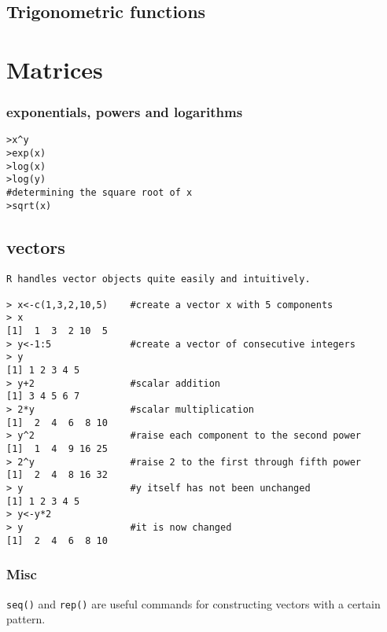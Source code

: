 \documentclass[a4paper,12pt]{article}
\begin{document}
\begin{itemize}
\subsection{Trigonometric functions}
\section{Matrices}



\subsubsection{exponentials, powers and logarithms}
\begin{framed}
\begin{verbatim}
>x^y
>exp(x)
>log(x)
>log(y)
#determining the square root of x
>sqrt(x)
\end{verbatim}
\end{framed}

\subsection{vectors}
\begin{framed}
\begin{verbatim}
R handles vector objects quite easily and intuitively.

> x<-c(1,3,2,10,5)    #create a vector x with 5 components
> x
[1]  1  3  2 10  5
> y<-1:5              #create a vector of consecutive integers
> y
[1] 1 2 3 4 5
> y+2                 #scalar addition
[1] 3 4 5 6 7
> 2*y                 #scalar multiplication
[1]  2  4  6  8 10
> y^2                 #raise each component to the second power
[1]  1  4  9 16 25
> 2^y                 #raise 2 to the first through fifth power
[1]  2  4  8 16 32
> y                   #y itself has not been unchanged
[1] 1 2 3 4 5
> y<-y*2
> y                   #it is now changed
[1]  2  4  6  8 10
\end{verbatim}
\end{framed}

\subsubsection{Misc}
\texttt{seq()} and \texttt{rep()} are useful commands for constructing vectors with a certain pattern.



\end{itemize}
\end{document}
